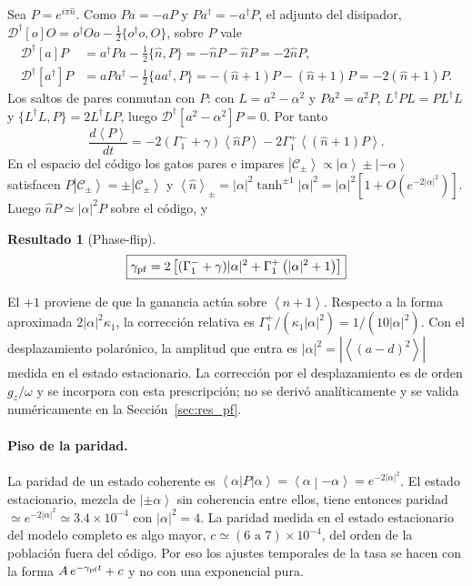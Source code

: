 \documentclass[11pt,a4paper]{article}
\newcommand{\ket}[1]{\left|#1\right\rangle}
\newcommand{\bra}[1]{\left\langle#1\right|}
\newcommand{\braket}[2]{\left\langle#1\middle|#2\right\rangle}
\newcommand{\ave}[1]{\left\langle#1\right\rangle}
\newcommand{\D}{\mathcal{D}}
\newcommand{\hn}{\hat n}
\theoremstyle{definition}
\newtheorem{resultado}{Resultado}
\begin{document}
Sea $P=e^{i\pi\hn}$. Como $Pa=-aP$ y $Pa^{\dagger}=-a^{\dagger}P$, el adjunto del disipador, $\D^{\dagger}[o]O=o^{\dagger}Oo-\tfrac12\{o^{\dagger}o,O\}$, sobre $P$ vale
\begin{align}
\D^{\dagger}[a]P&=a^{\dagger}Pa-\tfrac12\{\hn,P\}=-\hn P-\hn P=-2\hn P,\\
\D^{\dagger}[a^{\dagger}]P&=aPa^{\dagger}-\tfrac12\{aa^{\dagger},P\}=-(\hn+1)P-(\hn+1)P=-2(\hn+1)P.
\end{align}
Los saltos de pares conmutan con $P$: con $L=a^2-\alpha^2$ y $Pa^2=a^2P$, $L^{\dagger}PL=PL^{\dagger}L$ y $\{L^{\dagger}L,P\}=2L^{\dagger}LP$, luego $\D^{\dagger}[a^2-\alpha^2]P=0$. Por tanto
\begin{equation}
\frac{d\ave{P}}{dt}=-2(\Gamma_1^{-}+\gamma)\ave{\hn P}-2\Gamma_1^{+}\ave{(\hn+1)P}.
\label{eq:dP}
\end{equation}
En el espacio del código los gatos pares e impares $\ket{\mathcal C_{\pm}}\propto\ket{\alpha}\pm\ket{-\alpha}$ satisfacen $P\ket{\mathcal C_{\pm}}=\pm\ket{\mathcal C_{\pm}}$ y $\ave{\hn}_{\pm}=|\alpha|^2\tanh^{\pm1}|\alpha|^2=|\alpha|^2[1+O(e^{-2|\alpha|^2})]$. Luego $\hn P\simeq|\alpha|^2P$ sobre el código, y
\begin{resultado}[Phase-flip]
\begin{equation}
\boxed{\gamma_{\rm pf}=2\left[(\Gamma_1^{-}+\gamma)|\alpha|^2+\Gamma_1^{+}\left(|\alpha|^2+1\right)\right]}
\label{eq:gpf}
\end{equation}
\end{resultado}
El $+1$ proviene de que la ganancia actúa sobre $\ave{\hn+1}$. Respecto a la forma aproximada $2|\alpha|^2\kappa_1$, la corrección relativa es $\Gamma_1^{+}/(\kappa_1|\alpha|^2)=1/(10|\alpha|^2)$. Con el desplazamiento polarónico, la amplitud que entra es $|\alpha|^2=|\ave{(a-d)^2}|$ medida en el estado estacionario. La corrección por el desplazamiento es de orden $g_z/\omega$ y se incorpora con esta prescripción; no se derivó analíticamente y se valida numéricamente en la Sección~\ref{sec:res_pf}.

\paragraph{Piso de la paridad.} La paridad de un estado coherente es $\bra{\alpha}P\ket{\alpha}=\braket{\alpha}{-\alpha}=e^{-2|\alpha|^2}$. El estado estacionario, mezcla de $\ket{\pm\alpha}$ sin coherencia entre ellos, tiene entonces paridad $\simeq e^{-2|\alpha|^2}\simeq3.4\times10^{-4}$ con $|\alpha|^2=4$. La paridad medida en el estado estacionario del modelo completo es algo mayor, $c\simeq(6\text{ a }7)\times10^{-4}$, del orden de la población fuera del código. Por eso los ajustes temporales de la tasa se hacen con la forma $A\,e^{-\gamma_{\rm pf}t}+c$ y no con una exponencial pura.
\end{document}
